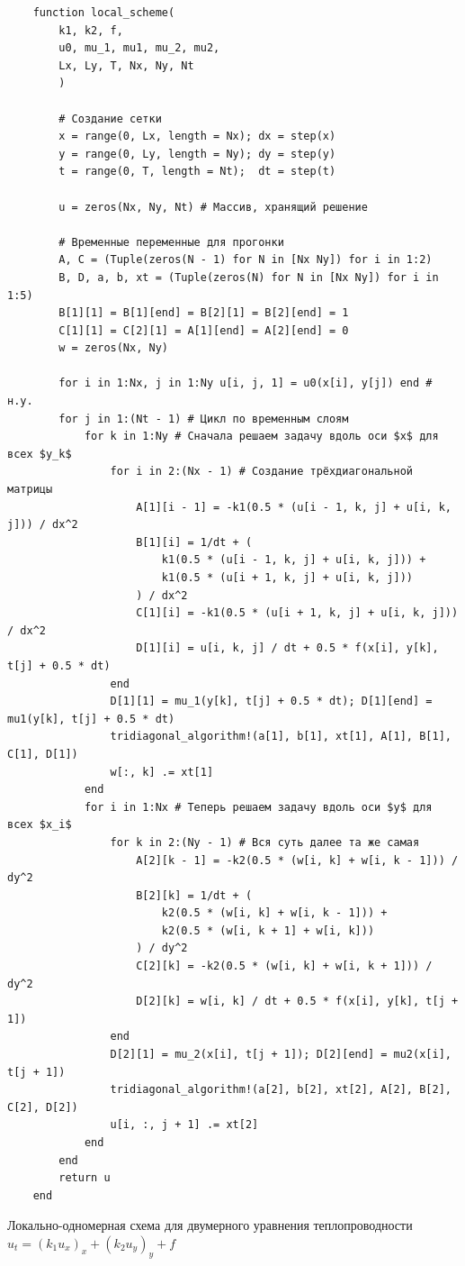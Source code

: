\begin{listing}
    \begin{verbatim}
    function local_scheme(
        k1, k2, f,
        u0, mu_1, mu1, mu_2, mu2,
        Lx, Ly, T, Nx, Ny, Nt
        )
    
        # Создание сетки
        x = range(0, Lx, length = Nx); dx = step(x)
        y = range(0, Ly, length = Ny); dy = step(y)
        t = range(0, T, length = Nt);  dt = step(t)
    
        u = zeros(Nx, Ny, Nt) # Массив, хранящий решение

        # Временные переменные для прогонки
        A, C = (Tuple(zeros(N - 1) for N in [Nx Ny]) for i in 1:2)
        B, D, a, b, xt = (Tuple(zeros(N) for N in [Nx Ny]) for i in 1:5)
        B[1][1] = B[1][end] = B[2][1] = B[2][end] = 1
        C[1][1] = C[2][1] = A[1][end] = A[2][end] = 0
        w = zeros(Nx, Ny)

        for i in 1:Nx, j in 1:Ny u[i, j, 1] = u0(x[i], y[j]) end # н.у.
        for j in 1:(Nt - 1) # Цикл по временным слоям
            for k in 1:Ny # Сначала решаем задачу вдоль оси $x$ для всех $y_k$
                for i in 2:(Nx - 1) # Создание трёхдиагональной матрицы
                    A[1][i - 1] = -k1(0.5 * (u[i - 1, k, j] + u[i, k, j])) / dx^2
                    B[1][i] = 1/dt + (
                        k1(0.5 * (u[i - 1, k, j] + u[i, k, j])) +
                        k1(0.5 * (u[i + 1, k, j] + u[i, k, j]))
                    ) / dx^2
                    C[1][i] = -k1(0.5 * (u[i + 1, k, j] + u[i, k, j])) / dx^2
                    D[1][i] = u[i, k, j] / dt + 0.5 * f(x[i], y[k], t[j] + 0.5 * dt)
                end
                D[1][1] = mu_1(y[k], t[j] + 0.5 * dt); D[1][end] = mu1(y[k], t[j] + 0.5 * dt)
                tridiagonal_algorithm!(a[1], b[1], xt[1], A[1], B[1], C[1], D[1])
                w[:, k] .= xt[1]
            end
            for i in 1:Nx # Теперь решаем задачу вдоль оси $y$ для всех $x_i$
                for k in 2:(Ny - 1) # Вся суть далее та же самая
                    A[2][k - 1] = -k2(0.5 * (w[i, k] + w[i, k - 1])) / dy^2
                    B[2][k] = 1/dt + (
                        k2(0.5 * (w[i, k] + w[i, k - 1])) +
                        k2(0.5 * (w[i, k + 1] + w[i, k]))
                    ) / dy^2
                    C[2][k] = -k2(0.5 * (w[i, k] + w[i, k + 1])) / dy^2
                    D[2][k] = w[i, k] / dt + 0.5 * f(x[i], y[k], t[j + 1])
                end
                D[2][1] = mu_2(x[i], t[j + 1]); D[2][end] = mu2(x[i], t[j + 1])
                tridiagonal_algorithm!(a[2], b[2], xt[2], A[2], B[2], C[2], D[2])
                u[i, :, j + 1] .= xt[2]
            end
        end
        return u
    end
    \end{verbatim}
    \caption{Локально-одномерная схема для двумерного уравнения теплопроводности $u_t = (k_1u_x)_x + (k_2 u_y)_y + f$}
    \label{listing:loc_scheme}
\end{listing}

